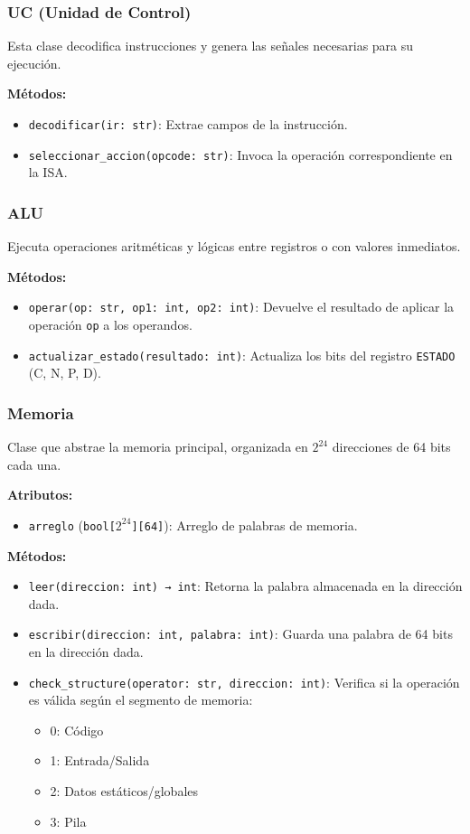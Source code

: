 \documentclass{article}
\begin{document}
\subsubsection*{UC (Unidad de Control)}

Esta clase decodifica instrucciones y genera las señales necesarias para su ejecución. 

\textbf{Métodos:}
\begin{itemize}
  \item \texttt{decodificar(ir: str)}: Extrae campos de la instrucción.
  \item \texttt{seleccionar\_accion(opcode: str)}: Invoca la operación correspondiente en la ISA.
\end{itemize}

\subsubsection*{ALU}

Ejecuta operaciones aritméticas y lógicas entre registros o con valores inmediatos.

\textbf{Métodos:}
\begin{itemize}
  \item \texttt{operar(op: str, op1: int, op2: int)}: Devuelve el resultado de aplicar 
        la operación \texttt{op} a los operandos.
  \item \texttt{actualizar\_estado(resultado: int)}: Actualiza los bits del 
        registro \texttt{ESTADO} (C, N, P, D).
\end{itemize}

\subsubsection*{Memoria}

Clase que abstrae la memoria principal, organizada en $2^{24}$ direcciones de 64 bits cada una.

\textbf{Atributos:}
\begin{itemize}
  \item \texttt{arreglo} (\texttt{bool[$2^{24}$][64]}): Arreglo de palabras de memoria.
\end{itemize}

\textbf{Métodos:}
\begin{itemize}
  \item \texttt{leer(direccion: int) → int}: Retorna la palabra almacenada en la dirección dada.
  \item \texttt{escribir(direccion: int, palabra: int)}: Guarda una palabra de 64 bits en 
        la dirección dada.
  \item \texttt{check\_structure(operator: str, direccion: int)}: Verifica si la operación es válida 
        según el segmento de memoria:
    \begin{itemize}
      \item 0: Código
      \item 1: Entrada/Salida
      \item 2: Datos estáticos/globales
      \item 3: Pila
    \end{itemize}
\end{itemize}
\end{document}
